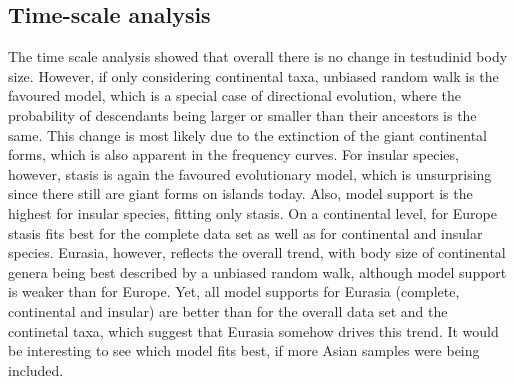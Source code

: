 





\subsection{Time-scale analysis}

The time scale analysis showed that overall there is no change in testudinid body size. However, if only considering continental taxa, unbiased random walk is the favoured model, which is a special case of directional evolution, where the probability of descendants being larger or smaller than their ancestors is the same.
This change is most likely due to the extinction of the giant continental forms, which is also apparent in the frequency curves. 
For insular species, however, stasis is again the favoured evolutionary model, which is unsurprising since there still are giant forms on islands today. Also, model support is the highest for insular species, fitting only stasis.
On a continental level, for Europe stasis fits best for the complete data set as well as for continental and insular species.
Eurasia, however, reflects the overall trend, with body size of continental genera being best described by a unbiased random walk, although model support is weaker than for Europe.
Yet, all model supports for Eurasia (complete, continental and insular) are better than for the overall data set and the continetal taxa, which suggest that Eurasia somehow drives this trend.
It would be interesting to see which model fits best, if more Asian samples were being included.

